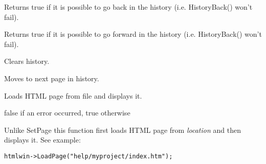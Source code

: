 \label{wxhtmlwindowhistorycanback}


Returns true if it is possible to go back in the history (i.e. HistoryBack()
won't fail).

\label{wxhtmlwindowhistorycanforward}


Returns true if it is possible to go forward in the history (i.e. HistoryBack()
won't fail).


\label{wxhtmlwindowhistoryclear}


Clears history.

\label{wxhtmlwindowhistoryforward}


Moves to next page in history.

\label{wxhtmlwindowloadfile}


Loads HTML page from file and displays it.


false if an error occurred, true otherwise



\label{wxhtmlwindowloadpage}


Unlike SetPage this function first loads HTML page from {\it location} 
and then displays it. See example:

\begin{verbatim}
htmlwin->LoadPage("help/myproject/index.htm");
\end{verbatim}




